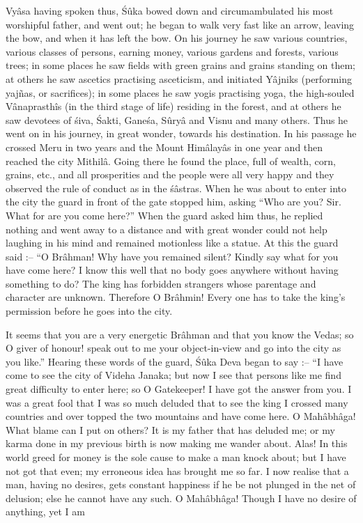 Vy\^asa having spoken thus, \'S\^uka bowed down and circumambulated his most worshipful father, and went out; he began to walk very fast like an arrow, leaving the bow, and when it has left the bow. On his journey he saw various countries, various classes of persons, earning money, various gardens and forests, various trees; in some places he saw fields with green grains and grains standing on them; at others he saw ascetics practising asceticism, and initiated Y\^ajniks (performing yajñas, or sacrifices); in some places he saw yogis practising yoga, the high-souled V\^anaprasth\^is (in the third stage of life) residing in the forest, and at others he saw devotees of \'siva, \'Sakti, Gane\'sa, S\^ury\^a and Visnu and many others. Thus he went on in his journey, in great wonder, towards his destination. In his passage he crossed Meru in two years and the Mount Him\^alay\^as in one year and then reached the city Mithil\^a. Going there he found the place, full of wealth, corn, grains, etc., and all prosperities and the people were all very happy and they observed the rule of conduct as in the \'s\^astras. When he was about to enter into the city the guard in front of the gate stopped him, asking ``Who are you? Sir. What for are you come here?'' When the guard asked him thus, he replied nothing and went away to a distance and with great wonder could not help laughing in his mind and remained motionless like a statue. At this the guard said :-- ``O Br\^ahman! Why have you remained silent? Kindly say what for you have come here? I know this well that no body goes anywhere without having something to do? The king has forbidden strangers whose parentage and character are unknown. Therefore O Br\^ahmin! Every one has to take the king's permission before he goes into the city.

It seems that you are a very energetic Br\^ahman and that you know the Vedas; so O giver of honour! speak out to me your object-in-view and go into the city as you like.'' Hearing these words of the guard, \'S\^uka Deva began to say :-- ``I have come to see the city of Videha Janaka; but now I see that persons like me find great difficulty to enter here; so O Gatekeeper! I have got the answer from you. I was a great fool that I was so much deluded that to see the king I crossed many countries and over topped the two mountains and have come here. O Mah\^abh\^aga! What blame can I put on others? It is my father that has deluded me; or my karma done in my previous birth is now making me wander about. Alas! In this world greed for money is the sole cause to make a man knock about; but I have not got that even; my erroneous idea has brought me so far. I now realise that a man, having no desires, gets constant happiness if he be not plunged in the net of delusion; else he cannot have any such. O Mah\^abh\^aga! Though I have no desire of anything, yet I am

